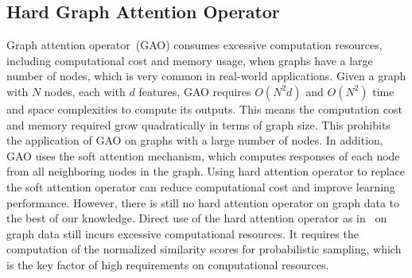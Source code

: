 \documentclass[sigconf]{acmart}
\begin{document}
\subsection{Hard Graph Attention Operator}

Graph attention operator~(GAO) consumes excessive computation
resources, including computational cost and memory usage, when
graphs have a large number of nodes, which is very common in
real-world applications. Given a graph with $N$ nodes, each with $d$
features, GAO requires $O(N^2d)$ and $O(N^2)$ time and space
complexities to compute its outputs. This means the computation cost
and memory required grow quadratically in terms of graph size. This
prohibits the application of GAO on graphs with a large number of
nodes. In addition, GAO uses the soft attention mechanism, which
computes responses of each node from all neighboring nodes in the
graph. Using hard attention operator to replace the soft attention
operator can reduce computational cost and improve learning
performance. However, there is still no hard attention operator on
graph data to the best of our knowledge. Direct use of the hard
attention operator as in~\cite{xu2015show} on graph data still
incurs excessive computational resources. It requires the
computation of the normalized similarity scores for probabilistic
sampling, which is the key factor of high requirements on
computational resources.
\end{document}
